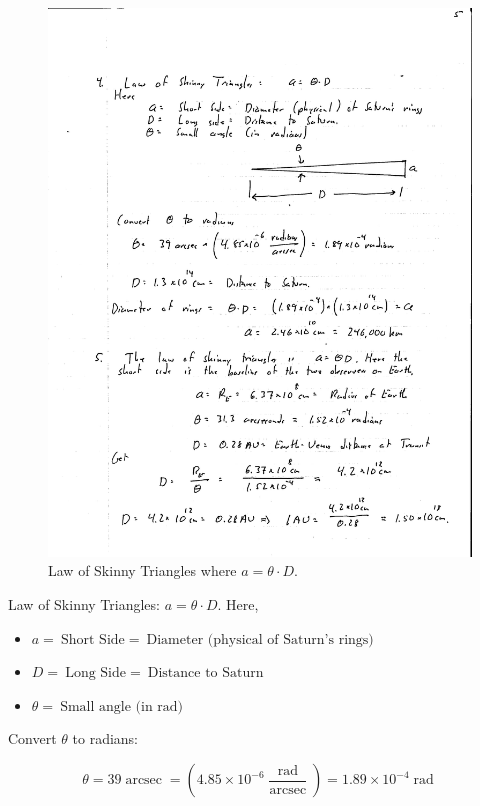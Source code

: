 \documentclass[11pt]{scrartcl}
\DeclareMathOperator{\arcsec}{arcsec}
\DeclareMathOperator{\rad}{rad}
\newcommand\pow[2]{\ensuremath{#1 \times 10^{#2}}}
\begin{document}
\begin{figure}[H]
\centering
\includegraphics[width=\textwidth]{figures/problem-set-1-skinny-triangle-hand.pdf}
\caption{Law of Skinny Triangles where $a = \theta \cdot D$.}
\end{figure}

Law of Skinny Triangles: $a = \theta \cdot D$. Here,

\begin{itemize}
\item $a =\ \text{Short Side} = \ \text{Diameter (physical of Saturn's rings)}$
\item $D = \ \text{Long Side} = \ \text{Distance to Saturn}$
\item $\theta = \ \text{Small angle (in rad)}$
\end{itemize}

Convert $\theta$ to radians:

\[\theta = 39\arcsec = \left(\pow{4.85}{-6}\frac{\rad}{\arcsec}\right) = \pow{1.89}{-4}\rad\]
\end{document}
